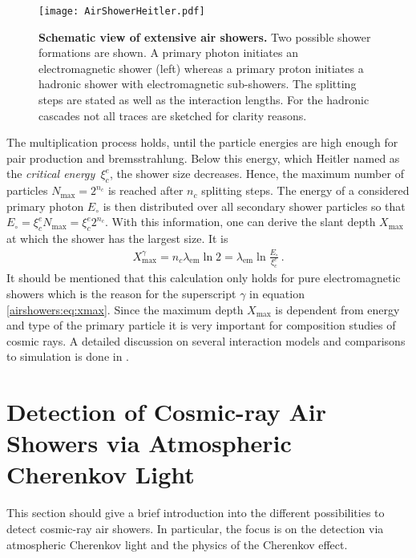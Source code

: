 \begin{figure}[h]
	\texttt{[image: AirShowerHeitler.pdf]}
	\caption[Schematic view of extensive air showers]{\textbf{Schematic view of extensive air showers.} \cite{famous:niggemann} Two possible shower formations are shown. A primary photon initiates an electromagnetic shower (left) whereas a primary proton initiates a hadronic shower with electromagnetic sub-showers. The splitting steps are stated as well as the interaction lengths. For the hadronic cascades not all traces are sketched for clarity reasons.}	
	\label{airshowers:cascades}
\end{figure}

The multiplication process holds, until the particle energies are high enough for pair production and bremsstrahlung. Below this energy, which Heitler named as the \textit{critical energy}~$\xi_c^e$, the shower size decreases. Hence, the maximum number of particles $N_\text{max} = 2^{n_c}$ is reached after $n_c$ splitting steps. The energy of a considered primary photon $E_\circ$ is then distributed over all secondary shower particles so that $E_\circ = \xi_c^e N_\text{max} = \xi_c^e 2^{n_c}$. With this information, one can derive the slant depth $X_\text{max}$ at which the shower has the largest size. It is
\begin{align}
	X_\text{max}^\gamma = n_c\lambda_\text{em}\ln{2} = \lambda_\text{em}\ln{\frac{E_\circ}{\xi_c^e}}\,.
	\label{airshowers:eq:xmax}
\end{align}
It should be mentioned that this calculation only holds for pure electromagnetic showers which is the reason for the superscript $\gamma$ in equation \eqref{airshowers:eq:xmax}. \cite{airshowers:heitlermodel}
Since the maximum depth $X_\text{max}$ is dependent from energy and type of the primary particle it is very important for composition studies of cosmic rays. A detailed discussion on several interaction models and comparisons to simulation is done in \cite{airshowers:heitlermodel}.

\section{Detection of Cosmic-ray Air Showers via Atmospheric Cherenkov Light}\label{sec:cherenkov}

This section should give a brief introduction into the different possibilities to detect cosmic-ray air showers. In particular, the focus is on the detection via atmospheric Cherenkov light and the physics of the Cherenkov effect.

